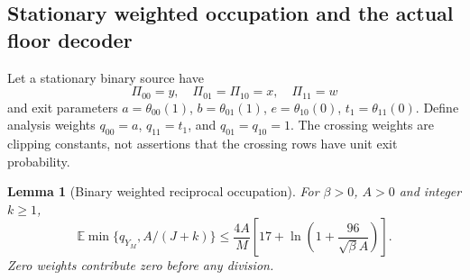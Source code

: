 \documentclass[11pt,letterpaper]{article}
\newtheorem{lemma}[theorem]{Lemma}
\theoremstyle{definition}\newtheorem{definition}[theorem]{Definition}
\theoremstyle{remark}\newtheorem{remark}[theorem]{Remark}
\newcommand{\E}{\mathbb{E}}
\begin{document}
\subsection{Stationary weighted occupation and the actual floor decoder}
Let a stationary binary source have
\[
 \Pi_{00}=y,\quad \Pi_{01}=\Pi_{10}=x,\quad \Pi_{11}=w
\]
and exit parameters
$a=\theta_{00}(1)$, $b=\theta_{01}(1)$,
$e=\theta_{10}(0)$, $t_1=\theta_{11}(0)$.
Define analysis weights
$q_{00}=a$, $q_{11}=t_1$, and $q_{01}=q_{10}=1$.
The crossing weights are clipping constants, not assertions that the crossing rows have unit exit probability.
\begin{lemma}[Binary weighted reciprocal occupation]\label{lem:binaryreturn}
For $\beta>0$, $A>0$ and integer $k\ge1$,
\begin{equation}\label{eq:binaryreturn}
 \E\min\{q_{Y_M},A/(J+k)\}
 \le\frac{4A}{M}\left[17+\ln\left(1+\frac{96}{\sqrt\beta A}\right)\right].
\end{equation}
Zero weights contribute zero before any division.
\end{lemma}
\end{document}
